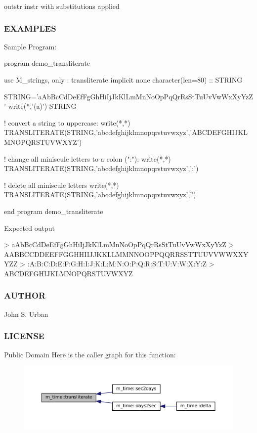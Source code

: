 outstr instr with substitutions applied

\subsubsection*{E\+X\+A\+M\+P\+L\+ES}

\begin{DoxyVerb}Sample Program:

 program demo_transliterate

 use M_strings, only : transliterate
 implicit none
 character(len=80)   :: STRING

 STRING='aAbBcCdDeEfFgGhHiIjJkKlLmMnNoOpPqQrRsStTuUvVwWxXyYzZ'
 write(*,'(a)') STRING

 ! convert a string to uppercase:
 write(*,*) TRANSLITERATE(STRING,'abcdefghijklmnopqrstuvwxyz','ABCDEFGHIJKLMNOPQRSTUVWXYZ')

 ! change all miniscule letters to a colon (":"):
 write(*,*) TRANSLITERATE(STRING,'abcdefghijklmnopqrstuvwxyz',':')

 ! delete all miniscule letters
 write(*,*) TRANSLITERATE(STRING,'abcdefghijklmnopqrstuvwxyz','')

 end program demo_transliterate

Expected output

 > aAbBcCdDeEfFgGhHiIjJkKlLmMnNoOpPqQrRsStTuUvVwWxXyYzZ
 > AABBCCDDEEFFGGHHIIJJKKLLMMNNOOPPQQRRSSTTUUVVWWXXYYZZ
 > :A:B:C:D:E:F:G:H:I:J:K:L:M:N:O:P:Q:R:S:T:U:V:W:X:Y:Z
 > ABCDEFGHIJKLMNOPQRSTUVWXYZ
\end{DoxyVerb}


\subsubsection*{A\+U\+T\+H\+OR}

John S. Urban \subsubsection*{L\+I\+C\+E\+N\+SE}

Public Domain Here is the caller graph for this function\+:\nopagebreak
\begin{figure}[H]
\begin{center}
\leavevmode
\includegraphics[width=350pt]{namespacem__time_a6e202d6d900515a44ab8a7cbb886a68e_icgraph}
\end{center}
\end{figure}
\mbox{\label{namespacem__time_a5d9e4a12c3418d67dc69a87780053d67}} 
